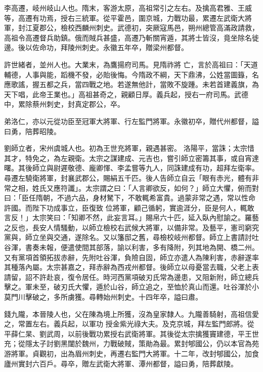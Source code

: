 \begin{pinyinscope}
 李高遷，岐州岐山人也。隋末，客游太原，高祖常引之左右。及擒高君雅、王威等，高遷有功焉，授右三統軍。從平霍邑，圍京城，力戰功最，累遷左武衛大將軍，封江夏郡公，檢校西麟州刺史。武德初，突厥寇馬邑，朔州總管高滿政請救，高祖令高遷督兵助鎮。俄而賊兵甚盛，高遷乃斬關宵遁，其將士皆沒，竟坐除名徙邊。後以佐命功，拜陵州刺史。永徽五年卒，贈梁州都督。



 許世緒者，並州人也。大業末，為鷹揚府司馬。見隋祚將
 亡，言於高祖曰：「天道輔德，人事與能，蹈機不發，必貽後悔。今隋政不綱，天下鼎沸，公姓當圖籙，名應歌謠，握五都之兵，當四戰之地。若遂無他計，當敗不旋踵。未若首建義旗，為天下唱，此帝王業也。」高祖甚奇之，親顧日厚。義兵起，授右一府司馬。武德中，累除蔡州刺史，封真定郡公，卒。



 弟洛仁，亦以元從功臣至冠軍大將軍、行左監門將軍。永徽初卒，贈代州都督，謚曰勇，陪葬昭陵。



 劉師立者，宋州虞城人也。初為王世充將軍，親遇甚密。
 洛陽平，當誅；太宗惜其才，特免之，為左親衛。太宗之謀建成、元吉也，嘗引師立密籌其事，或自宵達曙。其後師立與尉遲敬德、龐卿惲、李孟嘗等九人，同誅建成有功，超拜左衛率。尋遷左驍衛將軍，封襄武郡公，賜絹五千匹。後人告師立自云「眼有赤光，體有非常之相，姓氏又應符讖」。太宗謂之曰：「人言卿欲反，如何？」師立大懼，俯而對曰：「臣任隋朝，不過六品，身材駑下，不敢輒希富貴。過蒙非常之遇，常以性命許國。而陛下功成事立，臣復致
 位將軍，顧己循躬，實逾涯分，臣是何人，輒敢言反！」太宗笑曰：「知卿不然，此妄言耳。」賜帛六十匹，延入臥內慰諭之。羅藝之反也，長安人情騷動，以師立檢校右武候大將軍，以備非常。及藝平，憲司窮究黨與，師立坐與交通，遂除名。又以籓邸之舊，尋檢校岐州都督。師立上書請討吐谷渾，書奏未報，便遣使間其部落，諭以利害，多有降附，列其地為開、橋二州。又有黨項首領拓拔赤辭，先附吐谷渾，負險自固，師立亦遣人為陳利害，赤辭遂率
 其種落內屬。太宗甚嘉之，拜赤辭為西戎州都督。後師立以母憂當去職，父老上表請留，詔不許赴哀，復令居任。時河西黨項破刃氏常為邊患，又阻新附，師立總兵擊之。軍未至，破刃氏大懼，遁於山谷，師立追之，至恤於真山而還。吐谷渾於小莫門川擊破之，多所虜獲。尋轉始州刺史。十四年卒，謚曰肅。



 錢九隴，本晉陵人也，父在陳為境上所獲，沒為皇家隸人。九隴善騎射，高祖信愛之，常置左右。義兵起，以軍功
 授金紫光祿大夫。及克京城，拜左監門郎將。從平薛仁杲、劉武周，以前後戰功累授右武衛將軍。其後從太宗擒獲竇建德，平王世充；從隱太子討劉黑闥於魏州，力戰破賊，策勛為最。累封郇國公，仍以本官為苑游將軍。貞觀初，出為眉州刺史，再遷右監門大將軍。十二年，改封郇國公，加食廬州實封六百戶。尋卒，贈左武衛大將軍、潭州都督，謚曰勇，陪葬獻陵。




\end{pinyinscope}
